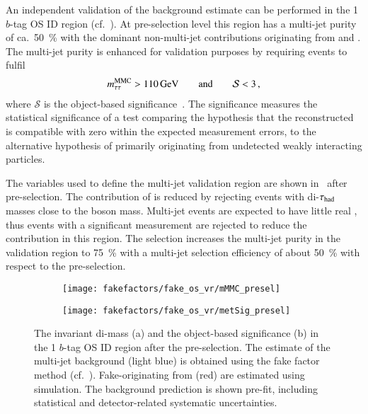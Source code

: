 An independent validation of the background estimate can be performed
in the 1 $b$-tag OS ID region (cf.\ ).
At pre-selection level this region has a multi-jet purity of ca.\
\SI{50}{\percent} with the dominant non-multi-jet contributions
originating from \Zjets and \ttbar. The multi-jet purity is enhanced
for validation purposes by requiring events to fulfil
\begin{align*}
  m_{\tau\tau}^\text{MMC} > \SI{110}{\ensuremath{\text{GeV}}} \qquad \text{and} \qquad \mathcal{S} < 3 \,\text{,}
\end{align*}
where $\mathcal{S}$ is the object-based \pTmissAbs
significance~\cite{ATLAS-CONF-2018-038}. The \pTmissAbs significance
measures the statistical significance of a test comparing the
hypothesis that the reconstructed \pTmissAbs is compatible with zero
within the expected measurement errors, to the alternative hypothesis
of \pTmissAbs primarily originating from undetected weakly interacting
particles.

The variables used to define the multi-jet validation region are shown
in~\Cref{fig:fake_factor_OSVR_cutvars} after pre-selection. The
contribution of \Zjets is reduced by rejecting events with
di-$\tau_{\text{had}}$ masses close to the \PZ boson mass.  Multi-jet events are
expected to have little real \pTmissAbs, thus events with a
significant \pTmissAbs measurement are rejected to reduce the \ttbar
contribution in this region. The selection increases the multi-jet
purity in the validation region to \SI{75}{\percent} with a multi-jet
selection efficiency of about \SI{50}{\percent} with respect to the
pre-selection.

\begin{figure}[htbp]
  \centering

  \begin{subfigure}{0.45\textwidth}
    \texttt{[image: fakefactors/fake\_os\_vr/mMMC\_presel]}
    \subcaption{}
  \end{subfigure}\hspace*{0.04\textwidth}%
  \begin{subfigure}{0.45\textwidth}
    \texttt{[image: fakefactors/fake\_os\_vr/metSig\_presel]}
    \subcaption{}
  \end{subfigure}

  \caption{The invariant di-\tauhad mass (a) and the object-based
    \pTmissAbs significance (b) in the 1 $b$-tag OS ID region after
    the pre-selection. The estimate of the multi-jet background (light
    blue) is obtained using the fake factor method (cf.\
    ). Fake-\tauhadvis originating from
    \ttbar (red) are estimated using simulation. The background
    prediction is shown pre-fit, including statistical and
    detector-related systematic uncertainties.}
  \label{fig:fake_factor_OSVR_cutvars}
\end{figure}

